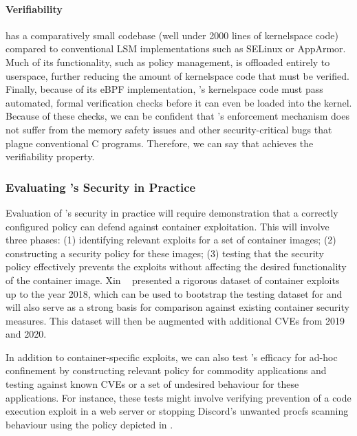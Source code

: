 \paragraph*{Verifiability}

\bpfcontain{} has a comparatively small codebase (well under 2000 lines of kernelspace code) compared to conventional LSM implementations such as SELinux or AppArmor. Much of its functionality, such as policy management, is offloaded entirely to userspace, further reducing the amount of kernelspace code that must be verified. Finally, because of its eBPF implementation, \bpfcontain{}'s kernelspace code must pass automated, formal verification checks before it can even be loaded into the kernel. Because of these checks, we can be confident that \bpfcontain{}'s enforcement mechanism does not suffer from the memory safety issues and other security-critical bugs that plague conventional C programs. Therefore, we can say that \bpfcontain{} achieves the verifiability property.

\subsubsection{Evaluating \bpfcontain{}'s Security in Practice}

Evaluation of \bpfcontain{}'s security in practice will require demonstration that a correctly configured \bpfcontain{} policy can defend against container exploitation. This will involve three phases: (1) identifying relevant exploits for a set of container images; (2) constructing a security policy for these images; (3) testing that the security policy effectively prevents the exploits without affecting the desired functionality of the container image. Xin \etal~\cite{xin2018_container_security} presented a rigorous dataset of container exploits up to the year 2018, which can be used to bootstrap the testing dataset for \bpfcontain{} and will also serve as a strong basis for comparison against existing container security measures. This dataset will then be augmented with additional CVEs from 2019 and 2020.

In addition to container-specific exploits, we can also test \bpfcontain{}'s efficacy for ad-hoc confinement by constructing relevant \bpfcontain{} policy for commodity applications and testing against known CVEs or a set of undesired behaviour for these applications. For instance, these tests might involve verifying prevention of a code execution exploit in a web server or stopping Discord's unwanted procfs scanning behaviour using the policy depicted in .

